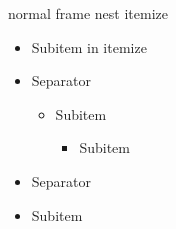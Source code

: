 \documentclass[11pt,compress,t,notes=noshow, xcolor=table]{beamer}
\begin{document}
\begin{frame}{normal frame nest itemize}
  \begin{itemize}
    \item Subitem in itemize
    \item Separator
    \begin{itemize}
        \item Subitem 
      \begin{itemize}
            \item Subitem 
      \end{itemize}
    \end{itemize}
    \item Separator
    \item Subitem 
  \end{itemize}
\end{frame}

\endlecture
\end{document}
